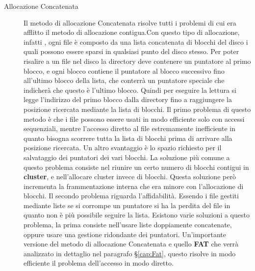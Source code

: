      \begin{description}
       \item[Allocazione Concatenata]
        Il metodo di allocazione Concatenata risolve tutti i problemi di cui era afflitto il metodo di allocazione contigua.Con questo tipo di allocazione, infatti , ogni file è composto da una lista concatenata di blocchi del disco i quali possono essere sparsi in qualsiasi punto del disco stesso. Per poter risalire a un file nel disco la directory deve contenere 
        un puntatore al primo blocco, e ogni blocco contiene il puntatore al blocco successivo fino all'ultimo blocco della lista, che conterrà un puntatore  speciale che indicherà che questo è l'ultimo blocco. Quindi per eseguire la lettura si legge l'indirizzo del primo blocco  dalla directory fino a raggiungere la posizione ricercata mediante la lista di blocchi.
        Il primo problema di questo metodo è che i file possono essere usati in modo efficiente solo con accessi sequenziali, mentre l'accesso diretto al file estremamente inefficiente in quanto bisogna scorrere tutta la lista di blocchi prima di arrivare alla posizione ricercata. 
        Un altro svantaggio è lo spazio richiesto per il salvataggio dei puntatori dei vari blocchi. La soluzione più comune a questo problema consiste nel riunire un certo numero di blocchi contigui in {\bf cluster}, e nell'allocare cluster invece di blocchi. Questa soluzione però incrementa la frammentazione interna che era minore con l'allocazione di blocchi.
        Il secondo problema riguarda l'affidabilità. Essendo i file gestiti mediante liste se si corrompe un puntatore si ha la perdita del file in quanto non è più possibile seguire la lista. Esistono varie soluzioni a questo problema, la prima consiste nell'usare liste doppiamente concatenate, oppure usare una gestione ridondante dei puntatori. 
        Un'importante versione del metodo di allocazione Concatenata e quello {\bf FAT} che verrà analizzato in dettaglio nel paragrafo §\ref{cap:Fat}, questo risolve in modo efficiente il problema dell'accesso in modo diretto. 
       \end{description}
